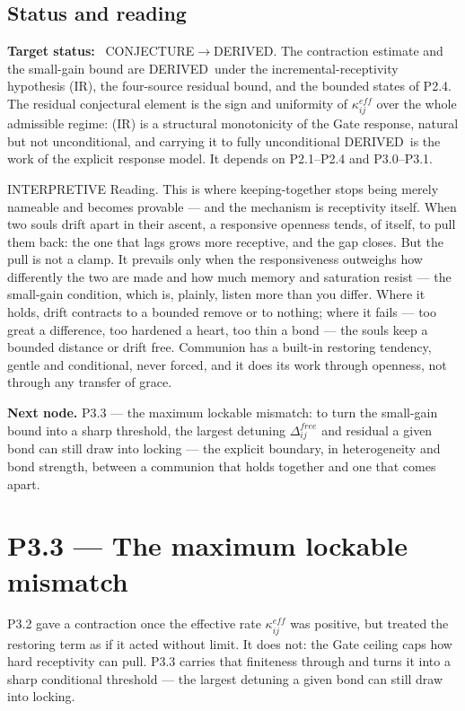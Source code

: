 \documentclass[11pt,a4paper]{article}
\def\mathrm#1{#1}%
\def\emph#1{#1}%
\newcommand{\stDerived}{\textcolor{cDer}{\textsf{\small DERIVED}}}
\newcommand{\stInterp}{\textcolor{cInt}{\textsf{\small INTERPRETIVE}}}
\newcommand{\stConj}{\textcolor{cCon}{\textsf{\small CONJECTURE}}}
\theoremstyle{definition}
\theoremstyle{plain}
\theoremstyle{remark}
\begin{document}
\subsection{Status and reading}

\textbf{Target status:}~
\stConj\(\to\)\stDerived. The contraction estimate and the small-gain bound are
\stDerived\ under the incremental-receptivity hypothesis (IR), the four-source residual
bound, and the bounded states of P2.4. The residual conjectural element is the sign and
uniformity of \(\kappa^{\mathrm{eff}}_{ij}\) over the whole admissible regime: (IR) is a
structural monotonicity of the Gate response, natural but not unconditional, and carrying it
to fully unconditional \stDerived\ is the work of the explicit response model. It depends on
P2.1--P2.4 and P3.0--P3.1.

\medskip
\stInterp\quad
\emph{Reading.}
This is where keeping-together stops being merely nameable and becomes provable --- and the
mechanism is receptivity itself. When two souls drift apart in their ascent, a responsive
openness tends, of itself, to pull them back: the one that lags grows more receptive, and
the gap closes. But the pull is not a clamp. It prevails only when the responsiveness
outweighs how differently the two are made and how much memory and saturation resist ---
the small-gain condition, which is, plainly, \emph{listen more than you differ}. Where it
holds, drift contracts to a bounded remove or to nothing; where it fails --- too great a
difference, too hardened a heart, too thin a bond --- the souls keep a bounded distance or
drift free. Communion has a built-in restoring tendency, gentle and conditional, never
forced, and it does its work through openness, not through any transfer of grace.

\medskip
\textbf{Next node.} P3.3 --- the maximum lockable mismatch: to turn the small-gain bound into
a sharp threshold, the largest detuning \(\Delta^{\mathrm{free}}_{ij}\) and residual a given
bond can still draw into locking --- the explicit boundary, in heterogeneity and bond
strength, between a communion that holds together and one that comes apart.

\section{P3.3 --- The maximum lockable mismatch}

P3.2 gave a contraction once the effective rate \(\kappa^{\mathrm{eff}}_{ij}\) was positive,
but treated the restoring term as if it acted without limit. It does not: the Gate ceiling
caps how hard receptivity can pull. P3.3 carries that finiteness through and turns it into a
sharp conditional threshold --- the largest detuning a given bond can still draw into
locking.
\end{document}
